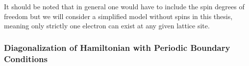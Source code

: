 \documentclass[11pt, a4paper]{article}
\theoremstyle{definition} %
\begin{document}

It should be noted that in general one would have to include the spin degrees of freedom but we will consider a simplified model without spins in this thesis, meaning only strictly one electron can exist at any given lattice site.

\subsubsection{Diagonalization of Hamiltonian with Periodic Boundary Conditions}
\end{document}
